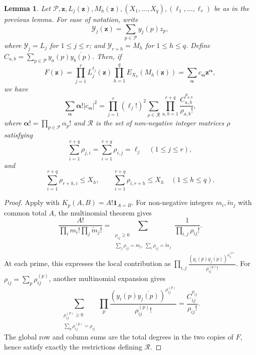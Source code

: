 \documentclass[oneside, 12pt]{amsart}
\newtheorem{lem}[thm]{Lemma}
\theoremstyle{definition}
\begin{document}
	\begin{lem}\label{balancedCoefficientExpansionLemma}
		Let $\mathcal{P}, \mathbf{z}, L_j(\mathbf{z}), M_h(\mathbf{z}),(X_1,\dots,X_q), (\ell_1,\dots,\ell_r)$ be as in the previous lemma. For ease of notation, write $${\mathcal{Y}_j(\mathbf z)}=\sum_{p\in \mathcal{P}} y_j(p)z_p,$$ where $\mathcal{Y}_j=L_j$ for $1\leq j \leq r$; and $\mathcal{Y}_{r+h}=M_h$ for $1\leq h \leq q$. Define $C_{a,b}=\sum_{p \in \mathcal{P}} y_{a}(p)\overline{y_{b}(p)}$. Then, if $$F(\mathbf{z})=\prod_{j=1}^r L_j^{\ell_j}(\mathbf{z})\prod_{h=1}^q E_{X_h}(M_h(\mathbf{z}))=\sum_{\boldsymbol{\alpha}} c_{\boldsymbol{\alpha}}\mathbf{z}^{\boldsymbol{\alpha}},$$ we have $$\sum_{\boldsymbol{\alpha}} \boldsymbol{\alpha}!|c_{\boldsymbol{\alpha}}|^2=\prod_{j=1}^r (\ell_j!)^2\sum_{\rho \in \mathscr{R}}\prod_{a,b=1}^{r+q} \frac{C_{a,b}^{\rho_{a,b}}}{\rho_{a,b}!},$$ where $\boldsymbol{\alpha}!=\prod_{p\in \mathcal{P}} \alpha_p!$ and {$\mathscr{R}$ is the set of non-negative integer matrices $\rho$ satisfying
			\[
			\sum_{i=1}^{r+q}\rho_{j,i}=
			\sum_{i=1}^{r+q}\rho_{i,j}=\ell_j
			\quad(1\leq j\leq r),
			\]
			and
			\[
			\sum_{i=1}^{r+q}\rho_{r+h,i}\leq X_h,
			\qquad
			\sum_{i=1}^{r+q}\rho_{i,r+h}\leq X_h
			\quad(1\leq h\leq q).
			\]}
	\end{lem}
	
	\begin{proof}
		Apply  with
		$K_p(A,B)=A!\mathbf1_{A=B}$.  For non-negative integers $m_i,\widetilde m_j$
		with common total $A$, the multinomial theorem gives
		\begin{equation}\label{balancedTransportIdentity}
			\frac{A!}{\prod_i m_i!\prod_j\widetilde m_j!}
			=
			\sum_{\substack{\rho_{ij}\geq0\\
					\sum_j\rho_{ij}=m_i,\ \sum_i\rho_{ij}=\widetilde m_j}}
			\frac1{\prod_{i,j}\rho_{ij}!}.
		\end{equation}
		At each prime, this expresses the local contribution as
		$\prod_{i,j}\frac{(y_i(p)\overline{y_j(p)})^{\rho^{(p)}_{ij}}}
		{\rho^{(p)}_{ij}!}$.  For $\rho_{ij}=\sum_p\rho^{(p)}_{ij}$,
		another multinomial expansion gives
		\[
		\sum_{\substack{\rho^{(p)}_{ij}\geq0\\
				\sum_p\rho^{(p)}_{ij}=\rho_{ij}}}
		\prod_p\frac{(y_i(p)\overline{y_j(p)})^{\rho^{(p)}_{ij}}}
		{\rho^{(p)}_{ij}!}
		=\frac{C_{ij}^{\rho_{ij}}}{\rho_{ij}!}.
		\]
		The global row and column sums are the total degrees in the two
		copies of $F$, hence satisfy exactly the restrictions defining
		$\mathscr R$.
	\end{proof}
	
\end{document}
